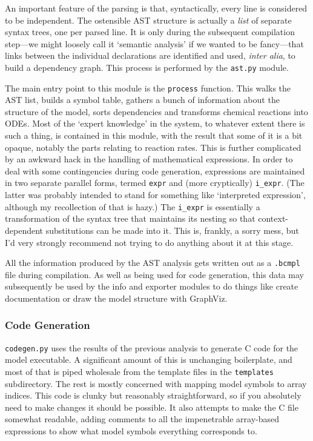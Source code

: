 \documentclass[a4paper,11pt]{article}
\begin{document}
An important feature of the parsing is that, syntactically, every line is considered to be independent. The ostensible AST structure is actually a \textit{list} of separate syntax trees, one per parsed line. It is only during the subsequent compilation step---we might loosely call it `semantic analysis' if we wanted to be fancy---that links between the individual declarations are identified and used, \textit{inter alia}, to build a dependency graph. This process is performed by the \texttt{ast.py} module.

The main entry point to this module is the \texttt{process} function. This walks the AST list, builds a symbol table, gathers a bunch of information about the structure of the model, sorts dependencies and transforms chemical reactions into ODEs. Most of the `expert knowledge' in the system, to whatever extent there is such a thing, is contained in this module, with the result that some of it is a bit opaque, notably the parts relating to reaction rates. This is further complicated by an awkward hack in the handling of mathematical expressions. In order to deal with some contingencies during code generation, expressions are maintained in two separate parallel forms, termed \texttt{expr} and (more cryptically) \texttt{i\_expr}. (The latter was probably intended to stand for something like `interpreted expression', although my recollection of that is hazy.) The \texttt{i\_expr} is essentially a transformation of the syntax tree that maintains its nesting so that context-dependent substitutions can be made into it. This is, frankly, a sorry mess, but I'd very strongly recommend not trying to do anything about it at this stage.

All the information produced by the AST analysis gets written out as a \texttt{.bcmpl} file during compilation. As well as being used for code generation, this data may subsequently be used by the info and exporter modules to do things like create documentation or draw the model structure with GraphViz.


\subsubsection{Code Generation}

\texttt{codegen.py} uses the results of the previous analysis to generate C code for the model executable. A significant amount of this is unchanging boilerplate, and most of that is piped wholesale from the template files in the \texttt{templates} subdirectory. The rest is mostly concerned with mapping model symbols to array indices. This code is clunky but reasonably straightforward, so if you absolutely need to make changes it should be possible. It also attempts to make the C file somewhat readable, adding comments to all the impenetrable array-based expressions to show what model symbols everything corresponds to.
\end{document}
